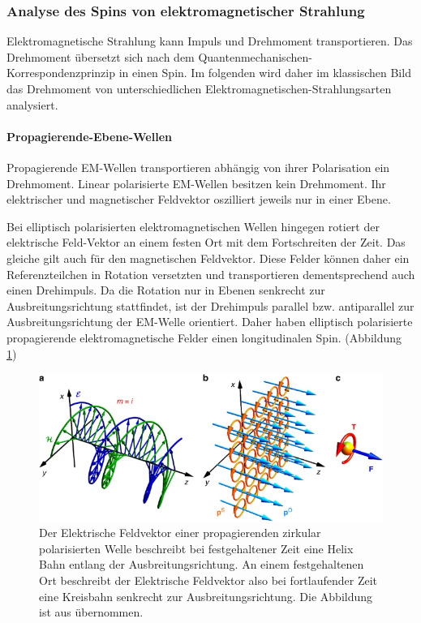 \documentclass[titlepage]{article}
\begin{document}
	
	
	\subsubsection{Analyse des Spins von elektromagnetischer Strahlung}
	Elektromagnetische Strahlung kann Impuls und Drehmoment transportieren. Das Drehmoment übersetzt sich nach dem Quantenmechanischen-Korrespondenzprinzip in einen Spin. Im folgenden wird daher im klassischen Bild das Drehmoment von unterschiedlichen Elektromagnetischen-Strahlungsarten analysiert.
	\paragraph{Propagierende-Ebene-Wellen}
	Propagierende EM-Wellen transportieren abhängig von ihrer Polarisation ein Drehmoment. Linear polarisierte EM-Wellen besitzen kein Drehmoment. Ihr elektrischer und magnetischer Feldvektor oszilliert jeweils nur in einer Ebene.
	
	Bei elliptisch polarisierten elektromagnetischen Wellen hingegen rotiert der elektrische Feld-Vektor an einem festen Ort mit dem Fortschreiten der Zeit. Das gleiche gilt auch für den magnetischen Feldvektor. Diese Felder können daher ein Referenzteilchen in Rotation versetzten und transportieren dementsprechend auch einen Drehimpuls. Da die Rotation nur in Ebenen senkrecht zur Ausbreitungsrichtung stattfindet, ist der Drehimpuls parallel bzw. antiparallel zur Ausbreitungsrichtung der EM-Welle orientiert. Daher haben elliptisch polarisierte propagierende elektromagnetische Felder einen longitudinalen Spin. (Abbildung \ref{fig:prop_spin})
	
	\begin{figure}[h]
		\centering
		\includegraphics[width=0.7\linewidth]{figures/spin/prop_spin}
		\caption{Der Elektrische Feldvektor einer propagierenden zirkular polarisierten Welle beschreibt bei festgehaltener Zeit eine Helix Bahn entlang der Ausbreitungsrichtung. An einem festgehaltenen Ort beschreibt der Elektrische Feldvektor also bei fortlaufender Zeit eine Kreisbahn senkrecht zur Ausbreitungsrichtung. Die Abbildung ist aus \cite{Bliokh.2014} übernommen.}
		\label{fig:prop_spin}
	\end{figure}
	
\end{document}
